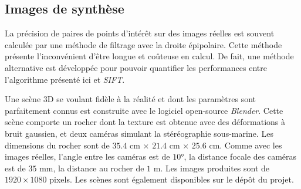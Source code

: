 \documentclass[
	a4paper, %
	10pt, %
	unnumberedsections, %
	twoside, %
]{LTJournalArticle}
\begin{document}
\subsection{Images de synthèse}
La précision de paires de points d'intérêt sur des images réelles est souvent calculée par une méthode de filtrage avec la droite épipolaire.
Cette méthode présente l'inconvénient d'être longue et coûteuse en calcul. De fait, une méthode alternative est développée
pour pouvoir quantifier les performances entre l'algorithme présenté ici et \textit{SIFT}.

Une scène 3D se voulant fidèle à la réalité et dont les paramètres sont parfaitement connus est construite avec le logiciel open-source \textit{Blender}.
Cette scène comporte un rocher dont la texture est obtenue avec des déformations à bruit gaussien, et deux caméras simulant la stéréographie sous-marine.
Les dimensions du rocher sont de $35.4$ cm $\times$ $21.4$ cm $\times$ $25.6$ cm.
Comme avec les images réelles, l'angle entre les caméras est de $10$°, la distance focale des caméras est de $35$ mm,
la distance au rocher de $1$ m. Les images produites sont de $1920 \times 1080$ pixels.
Les scènes sont également disponibles sur le dépôt du projet.
\end{document}
